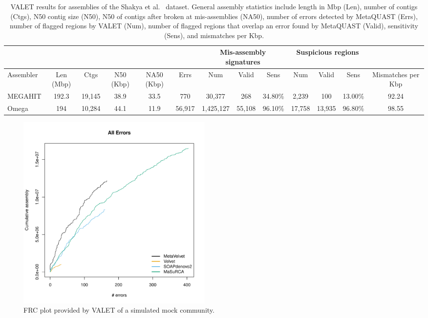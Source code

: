 \documentclass{article}
\begin{document}
\begin{landscape}
\begin{table}[tb!]
\centering
\footnotesize
\label{synthetic_valet}
\begin{tabular}{|l|c|c|c|c|c|c|c|c|c|c|c|c|}
  \hline
  \multicolumn{6}{|c}{} & \multicolumn{3}{|c|}{Mis-assembly signatures} & \multicolumn{3}{c|}{Suspicious regions}   &  \\
  \hline
  Assembler & Len (Mbp) & Ctgs   & N50 (Kbp) & NA50 (Kbp) & Errs   & Num       & Valid  & Sens    & Num    & Valid  & Sens    & Mismatches per Kbp \\
  \hline
  MEGAHIT   & 192.3     & 19,145 & 38.9      & 33.5       & 770    & 30,377    & 268    & 34.80\% & 2,239  & 100    & 13.00\% & 92.24              \\
  Omega     & 194       & 10,284 & 44.1      & 11.9       & 56,917 & 1,425,127 & 55,108 & 96.10\% & 17,758 & 13,935 & 96.80\% & 98.55 \\
  \hline
\end{tabular}
\caption[VALET results for assemblies of the Shakya et al.~\citep{shakya2013comparative} dataset]{VALET results for assemblies of the Shakya et al.~\citep{shakya2013comparative} dataset. General assembly statistics include length in Mbp (Len), number of contigs (Ctgs), N50 contig size (N50), N50 of contigs after broken at mis-assemblies (NA50), number of errors detected by MetaQUAST (Errs), number of flagged regions by VALET (Num), number of flagged regions that overlap an error found by MetaQUAST (Valid), sensitivity (Sens), and mismatches per Kbp.}
\end{table}

\end{landscape}

\begin{figure}[tb!]
\begin{center}
\includegraphics[width=3.86in]{figures/simulated_frc}
\end{center}
\caption[FRC plot of a simulated mock community]{FRC plot provided by VALET of a simulated mock community.}
\label{fig:mock_frc}
\end{figure}
\end{document}
